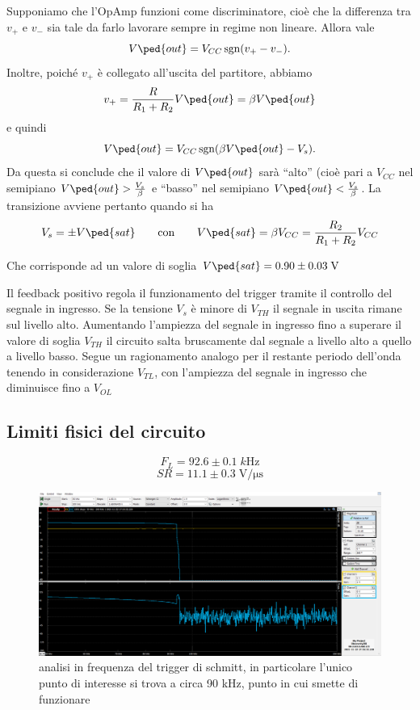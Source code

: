 \documentclass[10pt,a4paper]{article}
\begin{document}
Supponiamo che l'OpAmp funzioni come discriminatore, cioè che la differenza tra $v_+ $ e $v_- $ sia tale da farlo lavorare sempre in regime non lineare. Allora vale
\[ V\ped{out} = V_{CC} \sgn(v_+ - v_-). \]
Inoltre, poiché $v_+ $ è collegato all'uscita del partitore, abbiamo
\[ v_+ = \frac{R}{R_1 + R_2} V \ped{out} = \beta V\ped{out} \]
e quindi
\[
V\ped{out} = V_{CC} \sgn(\beta V\ped{out} - V_s)
.\]
Da questa si conclude che il valore di $V\ped{out} $ sarà ``alto''
(cioè pari a $ V_{CC} $ nel semipiano $V\ped{out} > \frac{V_s}{\beta}$ e
``basso'' nel semipiano $ V \ped{out} < \frac{V_s}{\beta}$. La transizione
avviene pertanto quando si ha
\[
V_s = \pm V \ped{sat} \qquad\text{con}\qquad V \ped{sat} = \beta V_{CC} = \frac{R_2}{R_1 + R_2} V_{CC}
\]

Che corrisponde ad un valore di soglia $V\ped{sat} = 0.90 \pm 0.03 \; \si{\V}$

Il feedback positivo regola il funzionamento del trigger tramite il controllo del segnale in ingresso. Se la tensione $V_s$ è minore di $V_{TH}$ il segnale in uscita rimane sul livello alto. Aumentando l’ampiezza del segnale in ingresso fino a superare il valore di soglia $V_{TH}$ il circuito salta bruscamente dal segnale a livello alto a quello a livello basso. Segue un ragionamento analogo per il restante periodo dell’onda tenendo in considerazione $V_{TL}$, con l’ampiezza del segnale in ingresso che
diminuisce fino a $V_{OL}$


\subsection{Limiti fisici del circuito}
\[
F_{L} = 92.6 \pm 0.1 \; \si{k\Hz}
\]
\[
SR = 11.1 \pm 0.3 \; \si{\V/\micro\s}
\]
\begin{figure}[htbp]
\centering
\includegraphics[scale=0.4]{schmitt_freq}
\caption{analisi in frequenza del trigger di schmitt, in particolare l'unico punto di interesse si trova a circa 90 kHz, punto in cui smette di funzionare}
\end{figure}
\end{document}
